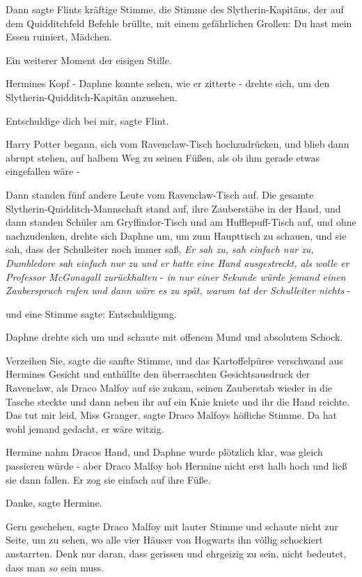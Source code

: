 Dann sagte Flints kräftige Stimme, die Stimme des Slytherin-Kapitäns, der auf
dem Quidditchfeld Befehle brüllte, mit einem gefährlichen Grollen: \glqq{}Du hast
mein Essen ruiniert, Mädchen.\grqq{}

Ein weiterer Moment der eisigen Stille.

Hermines Kopf - Daphne konnte sehen, wie er zitterte - drehte sich, um den
Slytherin-Quidditch-Kapitän anzusehen.

\glqq{}Entschuldige dich bei mir\grqq{}, sagte Flint.

Harry Potter begann, sich vom Ravenclaw-Tisch hochzudrücken, und blieb dann
abrupt stehen, auf halbem Weg zu seinen Füßen, als ob ihm gerade etwas
eingefallen wäre -

Dann standen fünf andere Leute vom Ravenclaw-Tisch auf. Die gesamte
Slytherin-Quidditch-Mannschaft stand auf, ihre Zauberstäbe in der Hand, und dann
standen Schüler am Gryffindor-Tisch und am Hufflepuff-Tisch auf, und ohne
nachzudenken, drehte sich Daphne um, um zum Haupttisch zu schauen, und sie sah,
dass der Schulleiter noch immer saß, \emph{Er sah zu, sah einfach nur zu,
Dumbledore sah einfach nur zu und er hatte eine Hand ausgestreckt, als wolle er
Professor McGonagall zurückhalten} - \emph{in nur einer Sekunde würde jemand
einen Zauberspruch rufen und dann wäre es zu spät, warum tat der Schulleiter
nichts} -

und eine Stimme sagte: \glqq{}Entschuldigung.\grqq{}

Daphne drehte sich um und schaute mit offenem Mund und absolutem Schock.

\glqq{}Verzeihen Sie\grqq{}, sagte die sanfte Stimme, und das Kartoffelpüree
verschwand aus Hermines Gesicht und enthüllte den überraschten Gesichtsausdruck
der Ravenclaw, als Draco Malfoy auf sie zukam, seinen Zauberstab wieder in die
Tasche steckte und dann neben ihr auf ein Knie kniete und ihr die Hand reichte.
\glqq{}Das tut mir leid, Miss Granger\grqq{}, sagte Draco Malfoys höfliche
Stimme. \glqq{}Da hat wohl jemand gedacht, er wäre witzig.\grqq{}

Hermine nahm Dracos Hand, und Daphne wurde plötzlich klar, was gleich passieren
würde - aber Draco Malfoy hob Hermine nicht erst halb hoch und ließ sie dann
fallen. Er zog sie einfach auf ihre Füße.

\glqq{}Danke\grqq{}, sagte Hermine.

\glqq{}Gern geschehen\grqq{}, sagte Draco Malfoy mit lauter Stimme und schaute
nicht zur Seite, um zu sehen, wo alle vier Häuser von Hogwarts ihn völlig
schockiert anstarrten. \glqq{}Denk nur daran, dass gerissen und ehrgeizig zu
sein, nicht bedeutet, dass man \emph{so} sein muss.\grqq{}

